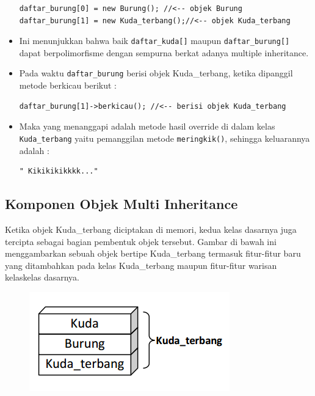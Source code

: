 \begin{itemize}
\begin{verbatim}
daftar_burung[0] = new Burung(); //<-- objek Burung
daftar_burung[1] = new Kuda_terbang();//<-- objek Kuda_terbang
\end{verbatim}
\item
  Ini menunjukkan bahwa baik \texttt{daftar\_kuda{[}{]}} maupun
  \texttt{daftar\_burung{[}{]}} dapat berpolimorfisme dengan sempurna
  berkat adanya multiple inheritance.
\item
  Pada waktu \texttt{daftar\_burung} berisi objek Kuda\_terbang, ketika
  dipanggil metode berkicau berikut :

\begin{verbatim}
daftar_burung[1]->berkicau(); //<-- berisi objek Kuda_terbang
\end{verbatim}
\item
  Maka yang menanggapi adalah metode hasil override di dalam kelas
  \texttt{Kuda\_terbang} yaitu pemanggilan metode \texttt{meringkik()},
  sehingga keluarannya adalah :

\begin{verbatim}
" Kikikikikkkk..."
\end{verbatim}
\end{itemize}

\subsection{Komponen Objek Multi
Inheritance}\label{komponen-objek-multi-inheritance}

Ketika objek Kuda\_terbang diciptakan di memori, kedua kelas dasarnya
juga tercipta sebagai bagian pembentuk objek tersebut. Gambar di bawah
ini menggambarkan sebuah objek bertipe Kuda\_terbang termasuk
fitur-fitur baru yang ditambahkan pada kelas Kuda\_terbang maupun
fitur-fitur warisan kelaskelas dasarnya.

\begin{figure}[htbp]
\centering
\includegraphics{images/capture9-2.png}
\caption{}
\end{figure}

